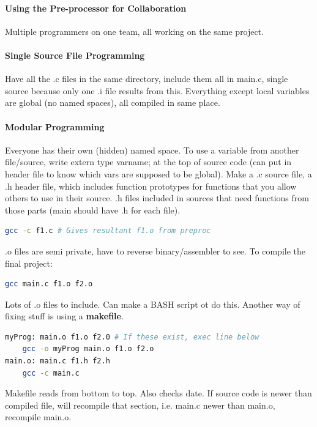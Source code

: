 \documentclass[12 pt]{article}
\begin{document}
\paragraph{Using the Pre-processor for Collaboration} Multiple programmers on one team, all working on the same project.
\paragraph{Single Source File Programming} Have all the .c files in the same directory, include them all in main.c, single source because only one .i file results from this. Everything except local variables are global (no named spaces), all compiled in same place.
\paragraph{Modular Programming} Everyone has their own (hidden) named space. To use a variable from another file/source, write extern type varname; at the top of source code (can put in header file to know which vars are supposed to be global). Make a .c source file, a .h header file, which includes function prototypes for functions that you allow others to use in their source. .h files included in sources that need functions from those parts (main should have .h for each file).
\begin{lstlisting}[language=bash]
gcc -c f1.c # Gives resultant f1.o from preproc
\end{lstlisting}
.o files are semi private, have to reverse binary/assembler to see. To compile the final project:
\begin{lstlisting}[language=bash]
gcc main.c f1.o f2.o
\end{lstlisting}
Lots of .o files to include. Can make a BASH script ot do this. Another way of fixing stuff is using a \textbf{makefile}.
\begin{lstlisting}[language=bash]
myProg: main.o f1.o f2.0 # If these exist, exec line below
    gcc -o myProg main.o f1.o f2.o
main.o: main.c f1.h f2.h
    gcc -c main.c
\end{lstlisting}
Makefile reads from bottom to top. Also checks date. If source code is newer than compiled file, will recompile that section, i.e. main.c newer than main.o, recompile main.o.
\end{document}
